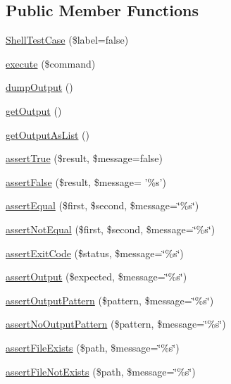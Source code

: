 \subsection*{Public Member Functions}
\begin{DoxyCompactItemize}
\item 
\hyperlink{class_shell_test_case_a9c5fa9fa230ab68848e100848c9cf24a}{ShellTestCase} (\$label=false)
\item 
\hyperlink{class_shell_test_case_a5ec49777fe58eba848d0d2db0f7ac98a}{execute} (\$command)
\item 
\hyperlink{class_shell_test_case_ac2d50f283cda194f94336bbcfd5e9007}{dumpOutput} ()
\item 
\hyperlink{class_shell_test_case_a92137846850cac08f6840b6def2d8f22}{getOutput} ()
\item 
\hyperlink{class_shell_test_case_a53847d86f26b9ffc12f030041628bcd9}{getOutputAsList} ()
\item 
\hyperlink{class_shell_test_case_adbfc654af0d720171eaebdf48324df1a}{assertTrue} (\$result, \$message=false)
\item 
\hyperlink{class_shell_test_case_a5457ff8ac3d1832fc34f8cae2e82fb5d}{assertFalse} (\$result, \$message= '\%s')
\item 
\hyperlink{class_shell_test_case_a9cfcfcb3b0516f335ce01944a2fdf0b4}{assertEqual} (\$first, \$second, \$message=\char`\"{}\%s\char`\"{})
\item 
\hyperlink{class_shell_test_case_a37aa31741b2d5fc1aac150efa0339bbf}{assertNotEqual} (\$first, \$second, \$message=\char`\"{}\%s\char`\"{})
\item 
\hyperlink{class_shell_test_case_a6d3b93005e0dd60d768c65f5b2f813c6}{assertExitCode} (\$status, \$message=\char`\"{}\%s\char`\"{})
\item 
\hyperlink{class_shell_test_case_a9961443a5439f183fad382d7a814ed61}{assertOutput} (\$expected, \$message=\char`\"{}\%s\char`\"{})
\item 
\hyperlink{class_shell_test_case_aa9bd5bb426cae9cf49bc36994c6b0d78}{assertOutputPattern} (\$pattern, \$message=\char`\"{}\%s\char`\"{})
\item 
\hyperlink{class_shell_test_case_ac00b2d0b2f8a37998e2ffbe16ea286e4}{assertNoOutputPattern} (\$pattern, \$message=\char`\"{}\%s\char`\"{})
\item 
\hyperlink{class_shell_test_case_a3ca9dde84e4ce935debf085d58e72aa7}{assertFileExists} (\$path, \$message=\char`\"{}\%s\char`\"{})
\item 
\hyperlink{class_shell_test_case_a7b9157f6e650db44eb308f860bf99228}{assertFileNotExists} (\$path, \$message=\char`\"{}\%s\char`\"{})

\end{DoxyCompactItemize}
